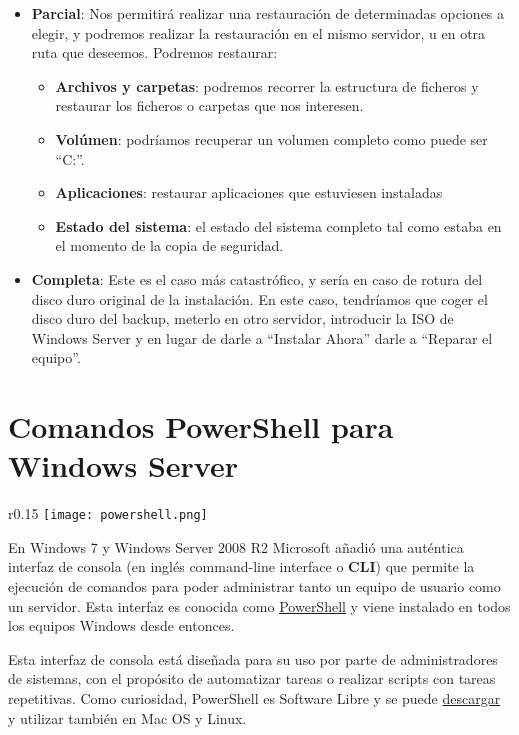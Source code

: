 \begin{itemize}
    \item \textbf{Parcial}: Nos permitirá realizar una restauración de determinadas opciones a elegir, y podremos realizar la restauración en el mismo servidor, u en otra ruta que deseemos. Podremos restaurar:
    \begin{itemize}
        \item \textbf{Archivos y carpetas}: podremos recorrer la estructura de ficheros y restaurar los ficheros o carpetas que nos interesen.
        \item \textbf{Volúmen}: podríamos recuperar un volumen completo como puede ser “C:”.
        \item \textbf{Aplicaciones}: restaurar aplicaciones que estuviesen instaladas
        \item \textbf{Estado del sistema}: el estado del sistema completo tal como estaba en el momento de la copia de seguridad.
    \end{itemize}

    \item \textbf{Completa}: Este es el caso más catastrófico, y sería en caso de rotura del disco duro original de la instalación. En este caso, tendríamos que coger el disco duro del backup, meterlo en otro servidor, introducir la ISO de Windows Server y en lugar de darle a “Instalar Ahora” darle a “Reparar el equipo”.
\end{itemize}


\chapter{Comandos PowerShell para Windows Server}
\begin{wrapfigure}{r}{0.15\linewidth}
    \centering
    \vspace{-20pt}
    \texttt{[image: powershell.png]}
    \vspace{-40pt}
\end{wrapfigure}
En Windows 7 y Windows Server 2008 R2 Microsoft añadió una auténtica  interfaz de consola (en inglés command-line interface o \textbf{CLI}) que permite la ejecución de comandos para poder administrar tanto un equipo de usuario como un servidor. Esta interfaz es conocida como \href{https://en.wikipedia.org/wiki/PowerShell}{PowerShell} y viene instalado en todos los equipos  Windows desde entonces.

Esta interfaz de consola está diseñada para su uso por parte de administradores de sistemas, con el propósito de automatizar tareas o realizar scripts con tareas repetitivas. Como curiosidad, PowerShell es Software Libre y se puede \href{https://github.com/PowerShell/PowerShell}{descargar} y utilizar también en Mac OS y Linux.

